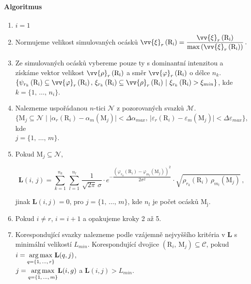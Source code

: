 \paragraph{Algoritmus}

\begin{enumerate}
\item $i = 1$

\item Normujeme velikost simulovaných ocásků $\vv{\xi}_r\left( \mathrm{R_i} \right) = \dfrac{\vv{\xi}_r\left( \mathrm{R_i} \right)}{\max \left( \vv{\xi}_r\left( \mathrm{R_i} \right) \right)}\,.$

\item Ze simulovaných ocásků vybereme pouze ty s dominantní intenzitou a získáme vektor velikost $\vv{\rho}_{r}\left(\mathrm{R_i}\right)$ a směr $\vv{\varphi}_{r}\left(\mathrm{R_i}\right)$ o délce $n_k$.\\ $\lbrace \psi_{r_k}\left(\mathrm{R_i}\right) \subseteq \vv{\varphi}_{r}\left(\mathrm{R_i}\right),\, \xi_{r_k}\left(\mathrm{R_i}\right) \subseteq \vv{\rho}_{r}\left(\mathrm{R_i}\right)\,|\,\, \xi_{r_k}\left(\mathrm{R_i}\right) > \xi_{min} \rbrace$, kde $k =\lbrace 1,\,\dots,\,n_i\rbrace $.

\item Nalezneme uspořádanou $n$-tici $\mathcal{N}$ z pozorovaných svazků $\mathcal{M}$. \\$\lbrace \mathrm{M}_j \subseteq \mathcal{N} \,\,|\,\,|\alpha_r(\mathrm{R}_i) - \alpha_m(\mathrm{M}_j) | < \Delta\alpha_{max},\, |\varepsilon_r(\mathrm{R}_i) - \varepsilon_m(\mathrm{M}_j) | < \Delta\varepsilon_{max} \rbrace$, kde \\$j=\lbrace 1,\,\dots,\,m \rbrace $.


\item Pokud $ \mathrm{M}_j \subseteq \mathcal{N}$, 

\begin{equation}
\mathbf{L}(i,\,j) = \overset{n_k}{\underset{{k = 1}}{\sum}}\, \overset{n_l}{\underset{{l = 1}}{\sum}}\,\dfrac{1}{\sqrt{2\pi}\, \sigma}\cdot e^{-\dfrac{\left(\varphi_{r_k}(\mathrm{R}_i)- \varphi_{m_l}(\mathrm{M}_j) \right)^2}{2\sigma^2}} \cdot \sqrt{\rho_{r_k}(\mathrm{R}_i)\, \rho_{m_l}(\mathrm{M}_j)}\,,
\label{eq:L_tails}
\end{equation}

  
jinak $\mathbf{L}(i,j) = 0$, pro $j =\lbrace 1,\,\dots,\,m \rbrace $, kde $n_l$ je počet ocásků $\mathrm{M_j}$.
  

\item Pokud $i \neq r$, $i = i+1$ a opakujeme kroky 2 až 5.

\item Korespondující svazky nalezneme podle vzájemně nejvyššího kritéria v $\mathbf{L}$ s minimální velikostí $L_{min}$. Korespondující dvojice $\left(\mathrm{R}_i,\,\mathrm{M}_j \right) \subseteq \mathcal{C}$, pokud  $i = \underset{{q = \lbrace1,\,\dots,\,r\rbrace}}{\operatorname*{arg\,max}}\mathbf{L}(q,j)$,\\ $j = \underset{{q = \lbrace1,\,\dots,\,m\rbrace}}{\operatorname*{arg\,max}}\mathbf{L}(i,g)$ a  $\mathbf{L}(i,j) > L_{min}$. 

\end{enumerate}

